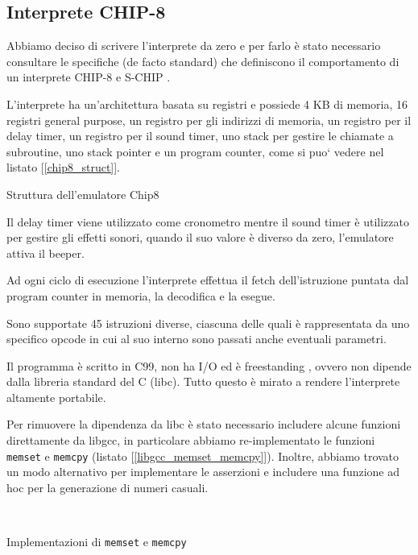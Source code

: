 \documentclass[a4paper]{article}
\begin{document}
\subsection{Interprete CHIP-8}

Abbiamo deciso di scrivere l'interprete da zero e per farlo è
stato necessario consultare le specifiche (de facto standard)
che definiscono il comportamento di un interprete
CHIP-8 \cite{cowgod:chip8} e S-CHIP \cite{cowgod:schip}.


L'interprete ha un'architettura basata su registri e possiede 4 KB
di memoria, 16 registri general purpose, un registro per gli
indirizzi di memoria, un registro per il delay timer,
un registro per il sound timer, uno stack per gestire le
chiamate a subroutine, uno stack pointer e un program counter, come si puo`
vedere nel listato [\ref{chip8_struct}].

\begin{Listing} %
    \centering
    \caption{Struttura dell'emulatore Chip8}
    \label{chip8_struct}
\end{Listing}

Il delay timer viene utilizzato come cronometro mentre il sound
timer è utilizzato per gestire gli effetti sonori, quando il suo
valore è diverso da zero, l'emulatore attiva il beeper.

Ad ogni ciclo di esecuzione l'interprete effettua il fetch
dell'istruzione puntata dal program counter in memoria,
la decodifica e la esegue.

Sono supportate 45 istruzioni diverse, ciascuna delle
quali è rappresentata da uno specifico opcode in cui al suo interno
sono passati anche eventuali parametri.

Il programma è scritto in C99, non ha I/O ed è freestanding
\cite{n1256:conformance}, ovvero non dipende dalla libreria
standard del C (libc). Tutto questo è mirato a rendere l'interprete
altamente portabile.

Per rimuovere la dipendenza da libc è stato necessario includere
alcune funzioni direttamente da libgcc, in particolare abbiamo re-implementato
le funzioni \texttt{memset} e \texttt{memcpy}
(listato [\ref{libgcc_memset_memcpy}]). Inoltre, abbiamo trovato un modo
alternativo per implementare le asserzioni e includere una funzione ad hoc per
la generazione di numeri casuali.

\begin{Listing} %
\centering
\mbox{
  \quad
}
\caption{Implementazioni di \texttt{memset} e \texttt{memcpy}}
\label{libgcc_memset_memcpy}
\end{Listing}
\end{document}
